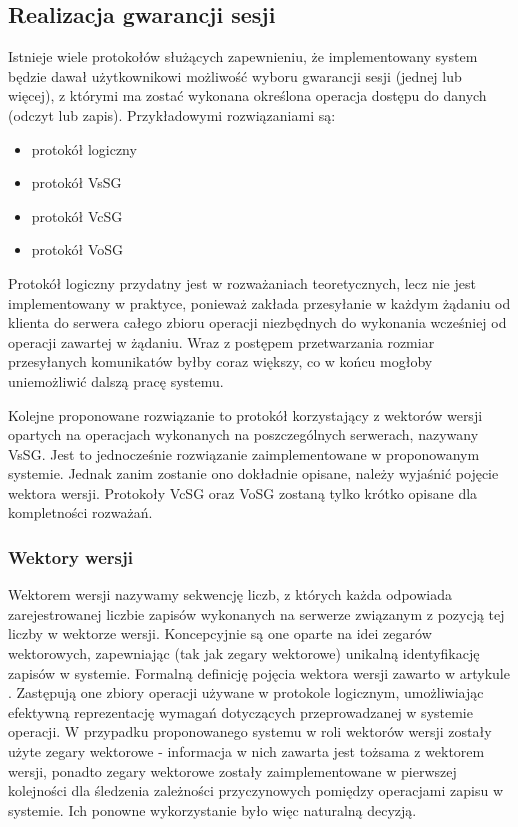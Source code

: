 \subsection{Realizacja gwarancji sesji}

Istnieje wiele protokołów służących zapewnieniu, że implementowany system będzie dawał użytkownikowi możliwość wyboru gwarancji sesji (jednej lub więcej), z którymi ma zostać wykonana określona operacja dostępu do danych (odczyt lub zapis). Przykładowymi rozwiązaniami są:
\begin{itemize}
    \item protokół logiczny
    \item protokół VsSG
    \item protokół VcSG
    \item protokół VoSG
\end{itemize}

Protokół logiczny przydatny jest w rozważaniach teoretycznych, lecz nie jest implementowany w praktyce, ponieważ zakłada przesyłanie w każdym żądaniu od klienta do serwera całego zbioru operacji niezbędnych do wykonania wcześniej od operacji zawartej w żądaniu. Wraz z postępem przetwarzania rozmiar przesyłanych komunikatów byłby coraz większy, co w końcu mogłoby uniemożliwić dalszą pracę systemu.

Kolejne proponowane rozwiązanie to protokół korzystający z wektorów wersji opartych na operacjach wykonanych na poszczególnych serwerach, nazywany VsSG. Jest to jednocześnie rozwiązanie zaimplementowane w proponowanym systemie. Jednak zanim zostanie ono dokładnie opisane, należy wyjaśnić pojęcie wektora wersji. Protokoły VcSG oraz VoSG zostaną tylko krótko opisane dla kompletności rozważań.

\subsubsection{Wektory wersji} \label{subsection:version_vector}

Wektorem wersji nazywamy sekwencję liczb, z których każda odpowiada zarejestrowanej liczbie zapisów wykonanych na serwerze związanym z pozycją tej liczby w wektorze wersji. Koncepcyjnie są one oparte na idei zegarów wektorowych, zapewniając (tak jak zegary wektorowe) unikalną identyfikację zapisów w systemie. Formalną definicję pojęcia wektora wersji zawarto w artykule \cite{10.1109/TSE.1983.236733}. Zastępują one zbiory operacji używane w protokole logicznym, umożliwiając efektywną reprezentację wymagań dotyczących przeprowadzanej w systemie operacji. W przypadku proponowanego systemu w roli wektorów wersji zostały użyte zegary wektorowe - informacja w nich zawarta jest tożsama z wektorem wersji, ponadto zegary wektorowe zostały zaimplementowane w pierwszej kolejności dla śledzenia zależności przyczynowych pomiędzy operacjami zapisu w systemie. Ich ponowne wykorzystanie było więc naturalną decyzją.

